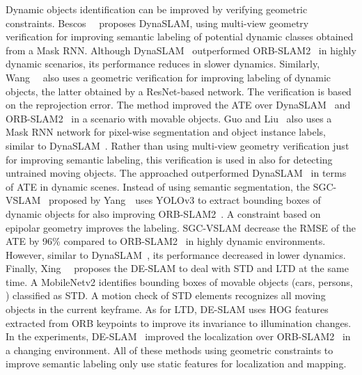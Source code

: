 Dynamic objects identification can be improved by verifying geometric constraints.
Bescos~\etal~\cite{bescos-et-al:2018:2860039} proposes DynaSLAM, using multi-view geometry verification for improving semantic labeling of potential dynamic classes obtained from a Mask \gls{RNN}. Although DynaSLAM~\cite{bescos-et-al:2018:2860039} outperformed ORB-SLAM2~\cite{discussion:orb-slam2} in highly dynamic scenarios, its performance reduces in slower dynamics.
Similarly, Wang~\etal~\cite{wang-et-al:2019:8793499} also uses a geometric verification for improving labeling of dynamic objects, the latter obtained by a ResNet-based network. The verification is based on the reprojection error. The method \cite{wang-et-al:2019:8793499} improved the \gls{ATE} over DynaSLAM~\cite{bescos-et-al:2018:2860039} and ORB-SLAM2~\cite{discussion:orb-slam2} in a scenario with movable objects.
Guo and Liu~\cite{guo-liu:2021:9739362} also uses a Mask \gls{RNN} network for pixel-wise segmentation and object instance labels, similar to DynaSLAM~\cite{bescos-et-al:2018:2860039}. Rather than using multi-view geometry verification just for improving semantic labeling, this verification is used in \cite{guo-liu:2021:9739362} also for detecting untrained moving objects. The approached \cite{guo-liu:2021:9739362} outperformed DynaSLAM~\cite{bescos-et-al:2018:2860039} in terms of \gls{ATE} in dynamic scenes.
Instead of using semantic segmentation, the \gls{SGC-VSLAM}~\cite{yang-et-al:2020:s20082432} proposed by Yang~\etal\  uses YOLOv3 to extract bounding boxes of dynamic objects for also improving ORB-SLAM2~\cite{discussion:orb-slam2}. A constraint based on epipolar geometry improves the labeling. \gls{SGC-VSLAM} decrease the \gls{RMSE} of the \gls{ATE} by 96\% compared to ORB-SLAM2~\cite{discussion:orb-slam2} in highly dynamic environments. However, similar to DynaSLAM~\cite{bescos-et-al:2018:2860039}, its performance decreased in lower dynamics.
Finally, Xing~\etal~\cite{xing-et-al:2022:22062} proposes the DE-SLAM to deal with \gls{STD} and \gls{LTD} at the same time. A MobileNetv2 identifies bounding boxes of movable objects (cars, persons, \etc) classified as \gls{STD}. A motion check of \gls{STD} elements recognizes all moving objects in the current keyframe. As for \gls{LTD}, DE-SLAM uses \gls{HOG} features extracted from ORB keypoints to improve its invariance to illumination changes. In the experiments, DE-SLAM~\cite{xing-et-al:2022:22062} improved the localization over ORB-SLAM2~\cite{discussion:orb-slam2} in a changing environment.
All of these methods using geometric constraints to improve semantic labeling only use static features for localization and mapping.




